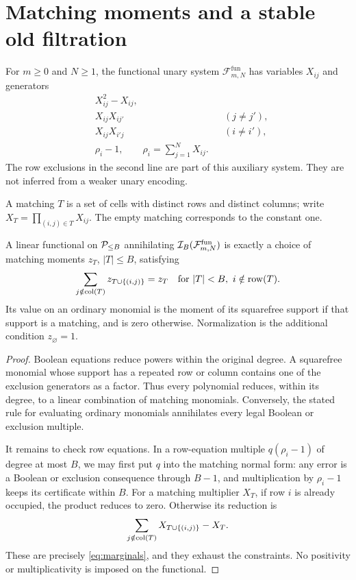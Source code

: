 \section{Matching moments and a stable old filtration}\label{sec:moments}

For \(m\ge0\) and \(N\ge1\), the functional unary system
\(\mathcal F^{\mathrm{fun}}_{m,N}\) has variables \(X_{ij}\) and generators
\begin{align*}
 &X_{ij}^2-X_{ij},\\
 &X_{ij}X_{ij'} &&(j\ne j'),\\
 &X_{ij}X_{i'j} &&(i\ne i'),\\
 &\rho_i-1,\qquad \rho_i=\sum_{j=1}^N X_{ij}.&
\end{align*}
The row exclusions in the second line are part of this auxiliary system.
They are not inferred from a weaker unary encoding.

A matching \(T\) is a set of cells with distinct rows and distinct columns;
write \(X_T=\prod_{(i,j)\in T}X_{ij}\).
The empty matching corresponds to the constant one.

\begin{lemma}\label{lem:marginals}
A linear functional on \(\mathcal P_{\le B}\) annihilating
\(\mathcal I_B(\mathcal F^{\mathrm{fun}}_{m,N})\) is exactly a choice of
matching moments \(z_T\), \(|T|\le B\), satisfying
\begin{equation}\label{eq:marginals}
 \sum_{j\notin\operatorname{col}(T)}z_{T\cup\{(i,j)\}}=z_T
 \quad\text{for }|T|<B,\ i\notin\operatorname{row}(T).
\end{equation}
Its value on an ordinary monomial is the moment of its squarefree support
if that support is a matching, and is zero otherwise. Normalization is the
additional condition \(z_\varnothing=1\).
\end{lemma}
\begin{proof}
Boolean equations reduce powers within the original degree.
A squarefree monomial whose support has a repeated row or column contains
one of the exclusion generators as a factor. Thus every polynomial reduces,
within its degree, to a linear combination of matching monomials.
Conversely, the stated rule for evaluating ordinary monomials annihilates
every legal Boolean or exclusion multiple.

It remains to check row equations. In a row-equation multiple
\(q(\rho_i-1)\) of degree at most \(B\), we may first put \(q\) into the
matching normal form: any error is a Boolean or exclusion consequence
through \(B-1\), and multiplication by \(\rho_i-1\) keeps its certificate
within \(B\). For a matching multiplier \(X_T\), if row \(i\) is already
occupied, the product reduces to zero. Otherwise its reduction is
\[
 \sum_{j\notin\operatorname{col}(T)}X_{T\cup\{(i,j)\}}-X_T.
 \]
These are precisely \eqref{eq:marginals}, and they exhaust the constraints.
No positivity or multiplicativity is imposed on the functional.
\end{proof}


